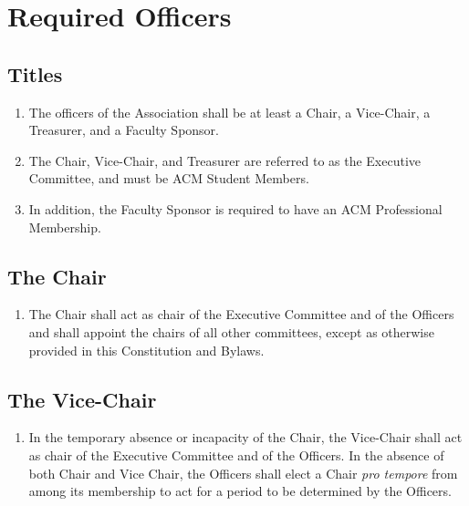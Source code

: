 \section{Required Officers}

\subsection{Titles}
\begin{enumerate}
	\item The officers of the Association shall be at least a Chair, a Vice-Chair, a Treasurer, and a Faculty Sponsor.
	\item The Chair, Vice-Chair, and Treasurer are referred to as the Executive Committee, and must be ACM Student Members.
	\item In addition, the Faculty Sponsor is required to have an ACM Professional Membership.
\end{enumerate}

\subsection{The Chair}
\begin{enumerate}
	\item The Chair shall act as chair of the Executive Committee and of the Officers and shall appoint the chairs of all other committees, except as otherwise provided in this Constitution and Bylaws.
\end{enumerate}

\subsection{The Vice-Chair}
\begin{enumerate}
	\item In the temporary absence or incapacity of the Chair, the Vice-Chair shall act as chair of the Executive Committee and of the Officers. In the absence of both Chair and Vice Chair, the Officers shall elect a Chair \textit{pro tempore} from among its membership to act for a period to be determined by the Officers.
\end{enumerate}

